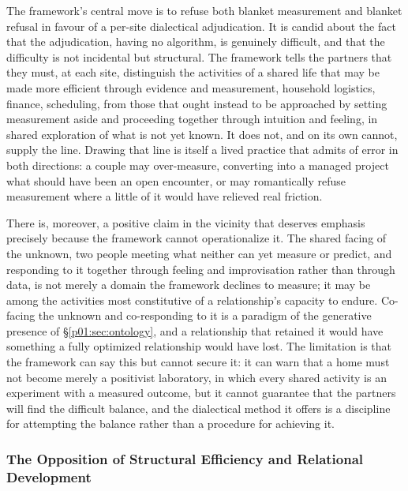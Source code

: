 \documentclass[11pt,a4paper]{article}
\begin{document}
The framework's central move is to refuse both blanket measurement and blanket refusal in favour of a per-site dialectical adjudication. It is candid about the fact that the adjudication, having no algorithm, is genuinely difficult, and that the difficulty is not incidental but structural. The framework tells the partners that they must, at each site, distinguish the activities of a shared life that may be made more efficient through evidence and measurement, household logistics, finance, scheduling, from those that ought instead to be approached by setting measurement aside and proceeding together through intuition and feeling, in shared exploration of what is not yet known. It does not, and on its own cannot, supply the line. Drawing that line is itself a lived practice that admits of error in both directions: a couple may over-measure, converting into a managed project what should have been an open encounter, or may romantically refuse measurement where a little of it would have relieved real friction.

There is, moreover, a positive claim in the vicinity that deserves emphasis precisely because the framework cannot operationalize it. The shared facing of the unknown, two people meeting what neither can yet measure or predict, and responding to it together through feeling and improvisation rather than through data, is not merely a domain the framework declines to measure; it may be among the activities most constitutive of a relationship's capacity to endure. Co-facing the unknown and co-responding to it is a paradigm of the generative presence of §\ref{p01:sec:ontology}, and a relationship that retained it would have something a fully optimized relationship would have lost. The limitation is that the framework can say this but cannot secure it: it can warn that a home must not become merely a positivist laboratory, in which every shared activity is an experiment with a measured outcome, but it cannot guarantee that the partners will find the difficult balance, and the dialectical method it offers is a discipline for attempting the balance rather than a procedure for achieving it.

\subsubsection{The Opposition of Structural Efficiency and Relational Development}
\end{document}
